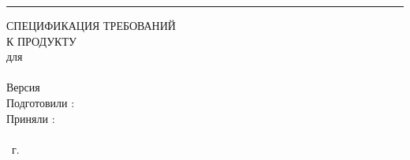 \begin{flushright}
    \rule{16cm}{5pt}\vskip1cm
    \begin{bfseries}
        \Huge{СПЕЦИФИКАЦИЯ ТРЕБОВАНИЙ\\ К ПРОДУКТУ}\\
        \vspace{1.5cm}
        для\\
        \vspace{1.5cm}
        \projectname\\
        \vspace{1.5cm}
        \LARGE{Версия \myversion}\\
        \vspace{1.5cm}
        Подготовили : \authors\\
        \vspace{1.5cm}
        Приняли : \assignee\\\assigneepost \\
        \vspace{1.5cm}
        \the\year~г.\\
    \end{bfseries}
\end{flushright}